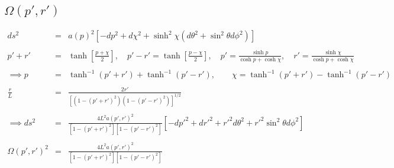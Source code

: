 \documentclass[10pt,letterpaper]{article}
\numberwithin{equation}{section}
\begin{document}
\subsection{$\Omega(p',r')$}
%
\begin{eqnarray}
ds^2 &=& a(p)^2\left[ -dp^2 + d\chi^2 + \sinh^2{\chi} (d\theta^2 + \sin^2\theta d\phi^2)\right]
\label{ds2p}
\\ \nonumber\\
p' + r' &=& \tanh\left[\frac{p+\chi}{2}\right],\quad p'-r' = \tanh\left[ \frac{p-\chi}{2}\right],
\quad p' = \frac{\sinh p }{\cosh p+\cosh\chi},\quad r' = \frac{\sinh\chi}{\cosh p + \cosh\chi}
\\ \nonumber\\
\implies p &=& \tanh^{-1}(p'+r')+\tanh^{-1}(p'-r'),\qquad \chi = \tanh^{-1}(p'+r')-\tanh^{-1}(p'-r')
\\ \nonumber\\
\frac{r}{L} &=& \frac{2r'}{\left[(1-(p'+r')^2)(1-(p'-r')^2)\right]^{1/2}}
\\ \nonumber\\
\implies ds^2 &=& \frac{4L^2 a(p',r')^2}{[1-(p'+r')^2][1-(p'-r')^2]}\left[ -dp'^2 + dr'^2 + r'^2 d\theta^2 + r'^2 \sin^2\theta d\phi^2\right]
\label{ds2rppp}
\\ \nonumber\\
\Omega(p',r')^2 &=&  \frac{4L^2 a(p',r')^2}{[1-(p'+r')^2][1-(p'-r')^2]}
\end{eqnarray}
%
\end{document}
